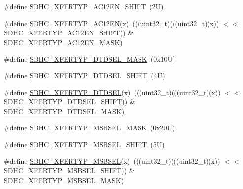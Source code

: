 \begin{DoxyCompactItemize}
\item 
\#define \mbox{\hyperlink{group___s_d_h_c___register___masks_ga2e8fdd12bcab3fa4d4e6823eabaf65a0}{S\+D\+H\+C\+\_\+\+X\+F\+E\+R\+T\+Y\+P\+\_\+\+A\+C12\+E\+N\+\_\+\+S\+H\+I\+FT}}~(2\+U)
\item 
\#define \mbox{\hyperlink{group___s_d_h_c___register___masks_ga134321b6fe79624cabf9208512807bc8}{S\+D\+H\+C\+\_\+\+X\+F\+E\+R\+T\+Y\+P\+\_\+\+A\+C12\+EN}}(x)~(((uint32\+\_\+t)(((uint32\+\_\+t)(x)) $<$$<$ \mbox{\hyperlink{group___s_d_h_c___register___masks_ga2e8fdd12bcab3fa4d4e6823eabaf65a0}{S\+D\+H\+C\+\_\+\+X\+F\+E\+R\+T\+Y\+P\+\_\+\+A\+C12\+E\+N\+\_\+\+S\+H\+I\+FT}})) \& \mbox{\hyperlink{group___s_d_h_c___register___masks_ga1940add41a5918da9c0b045597e0c497}{S\+D\+H\+C\+\_\+\+X\+F\+E\+R\+T\+Y\+P\+\_\+\+A\+C12\+E\+N\+\_\+\+M\+A\+SK}})
\item 
\#define \mbox{\hyperlink{group___s_d_h_c___register___masks_ga608ac3efa7417c8763511d336a8cb6c7}{S\+D\+H\+C\+\_\+\+X\+F\+E\+R\+T\+Y\+P\+\_\+\+D\+T\+D\+S\+E\+L\+\_\+\+M\+A\+SK}}~(0x10\+U)
\item 
\#define \mbox{\hyperlink{group___s_d_h_c___register___masks_ga669da614be8810a42499b583e2ce2617}{S\+D\+H\+C\+\_\+\+X\+F\+E\+R\+T\+Y\+P\+\_\+\+D\+T\+D\+S\+E\+L\+\_\+\+S\+H\+I\+FT}}~(4\+U)
\item 
\#define \mbox{\hyperlink{group___s_d_h_c___register___masks_ga679e4c0d160f02ad0c18b2e52a2f06ae}{S\+D\+H\+C\+\_\+\+X\+F\+E\+R\+T\+Y\+P\+\_\+\+D\+T\+D\+S\+EL}}(x)~(((uint32\+\_\+t)(((uint32\+\_\+t)(x)) $<$$<$ \mbox{\hyperlink{group___s_d_h_c___register___masks_ga669da614be8810a42499b583e2ce2617}{S\+D\+H\+C\+\_\+\+X\+F\+E\+R\+T\+Y\+P\+\_\+\+D\+T\+D\+S\+E\+L\+\_\+\+S\+H\+I\+FT}})) \& \mbox{\hyperlink{group___s_d_h_c___register___masks_ga608ac3efa7417c8763511d336a8cb6c7}{S\+D\+H\+C\+\_\+\+X\+F\+E\+R\+T\+Y\+P\+\_\+\+D\+T\+D\+S\+E\+L\+\_\+\+M\+A\+SK}})
\item 
\#define \mbox{\hyperlink{group___s_d_h_c___register___masks_gafb2312829ed2798040e4b2b0f17a0114}{S\+D\+H\+C\+\_\+\+X\+F\+E\+R\+T\+Y\+P\+\_\+\+M\+S\+B\+S\+E\+L\+\_\+\+M\+A\+SK}}~(0x20\+U)
\item 
\#define \mbox{\hyperlink{group___s_d_h_c___register___masks_ga9f13f1a35f73d15da1cb2e89a6919e30}{S\+D\+H\+C\+\_\+\+X\+F\+E\+R\+T\+Y\+P\+\_\+\+M\+S\+B\+S\+E\+L\+\_\+\+S\+H\+I\+FT}}~(5\+U)
\item 
\#define \mbox{\hyperlink{group___s_d_h_c___register___masks_ga372fba83a45f1dc2faf94c2d0ea44f35}{S\+D\+H\+C\+\_\+\+X\+F\+E\+R\+T\+Y\+P\+\_\+\+M\+S\+B\+S\+EL}}(x)~(((uint32\+\_\+t)(((uint32\+\_\+t)(x)) $<$$<$ \mbox{\hyperlink{group___s_d_h_c___register___masks_ga9f13f1a35f73d15da1cb2e89a6919e30}{S\+D\+H\+C\+\_\+\+X\+F\+E\+R\+T\+Y\+P\+\_\+\+M\+S\+B\+S\+E\+L\+\_\+\+S\+H\+I\+FT}})) \& \mbox{\hyperlink{group___s_d_h_c___register___masks_gafb2312829ed2798040e4b2b0f17a0114}{S\+D\+H\+C\+\_\+\+X\+F\+E\+R\+T\+Y\+P\+\_\+\+M\+S\+B\+S\+E\+L\+\_\+\+M\+A\+SK}})
$$
\end{DoxyCompactItemize}

